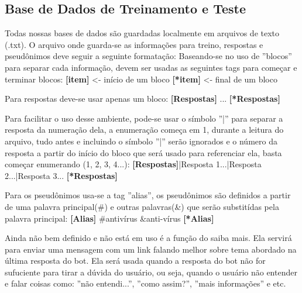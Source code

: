 \subsection{Base de Dados de Treinamento e Teste}
    Todas nossas bases de dados são guardadas localmente em arquivos de texto (.txt). O arquivo onde guarda-se as informações para treino, respostas e pseudônimos deve seguir a seguinte formatação:
    Baseando-se no uso de ''blocos'' para separar cada informação, devem ser usadas as seguintes tags para começar e terminar blocos:\newline
    \textbf{[item]} <- início de um bloco\newline
    \textbf{[*item]} <- final de um bloco\newline
    \par Para respostas deve-se usar apenas um bloco:\newline
    \textbf{[Respostas]}\newline
    ...\newline
    \textbf{[*Respostas]}
    \par
    Para facilitar o uso desse ambiente, pode-se usar o símbolo ''|'' para separar a resposta da numeração dela, a enumeração começa em 1, durante a leitura do arquivo, tudo antes e incluindo o símbolo ''|'' serão ignorados e o número da resposta a partir do início do bloco que será usado para referenciar ela, basta começar enumerando (1, 2, 3, 4...):\newline
    \textbf{[Respostas]}|Resposta 1...|Resposta 2...|Resposta 3...\newline
    \textbf{[*Respostas]}
    \par
    Para os pseudônimos usa-se a tag ''alias'', os pseudônimos são definidos a partir de uma palavra principal(\#) e outras palavras(\&) que serão substitídas pela palavra principal:\newline
    \textbf{[Alias]}\newline
    \#antivírus\newline
    \&anti-vírus\newline
    \textbf{[*Alias]}\newline
    \par
    Ainda não bem definido e não está em uso é a função do saiba mais. Ela servirá para enviar uma mensagem com um link falando melhor sobre tema abordado na última resposta do bot. Ela será usada quando a resposta do bot não for sufuciente para tirar a dúvida do usuário, ou seja, quando o usuário não entender e falar coisas como: ''não entendi...'', ''como assim?'', ''mais informações'' e etc. 
